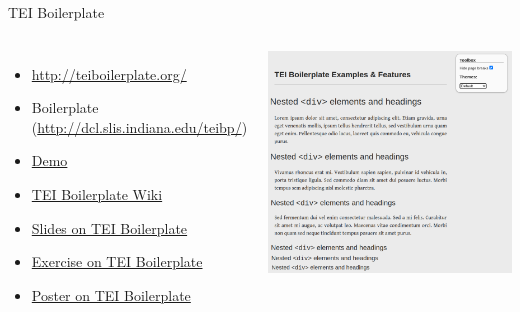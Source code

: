 \begin{frame}{TEI Boilerplate}

\begin{columns}
\begin{itemize}\footnotesize
    \item \protect\url{http://teiboilerplate.org/}
    \item Boilerplate (\protect\url{http://dcl.slis.indiana.edu/teibp/})
    \item \href{http://dcl.slis.indiana.edu/teibp/content/demo.xml}{Demo}
    \item \href{https://wiki.tei-c.org/index.php/TEI_Boilerplate}{TEI Boilerplate Wiki}
    \item \href{https://www.i-d-e.de/wp-content/uploads/2014/07/boilerplate.pdf}{Slides on TEI Boilerplate}
    \item \href{http://tei.it.ox.ac.uk/Talks/2015-07-dhoxss/ex-boilerplate.pdf}{Exercise on TEI Boilerplate}
    \item \href{http://journalofdigitalhumanities.org/2-3/tei-boilerplate}{Poster on TEI Boilerplate}
\end{itemize}

\includegraphics[width=\textwidth]{img/tei-boilerplate-example.png}
\end{columns}

\end{frame}

